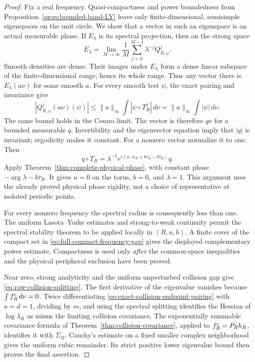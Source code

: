 \begin{proof}
Fix a real frequency. Quasi-compactness and power boundedness from
Proposition~\ref{prop:bounded-band-LY} leave only finite-dimensional,
semisimple eigenspaces on the unit circle. We show that a vector in
such an eigenspace is an actual measurable phase. If $E_\lambda$ is
its spectral projection, then on the strong space
\[
 E_\lambda=\lim_{M\to\infty}\frac1M
                       \sum_{j=0}^{M-1}\lambda^{-j}Q_{R,\omega}^j.
\]
Smooth densities are dense. Their images under $E_\lambda$ form a dense
linear subspace of the finite-dimensional range, hence its whole range.
Thus any vector there is $E_\lambda(a\nu)$ for some smooth $a$.
For every smooth test $\psi$, the exact pairing and invariance give
\[
 |Q_{R,\omega}^j(a\nu)(\psi)|
       \le\|a\|_\infty\int|\psi\circ T_R^j|\,d\nu
       =\|a\|_\infty\int|\psi|\,d\nu.
\]
The same bound holds in the Cesaro limit. The vector is therefore
$q\nu$ for a bounded measurable $q$. Invertibility and the eigenvector
equation imply that $|q|$ is invariant; ergodicity makes it constant.
For a nonzero vector normalize it to one. Then
\[
 q\circ T_R=\lambda^{-1}
   e^{i(u\cdot\kappa_R+b\tau_R-b\bar\tau_R)}q.
\]
Apply Theorem~\ref{thm:complete-physical-phase}, with constant phase
$-\arg\lambda-b\bar\tau_R$. It gives $u=0$ on the torus, $b=0$,
and $\lambda=1$. This argument uses the already proved physical phase
rigidity, not a choice of representative at isolated periodic points.

For every nonzero frequency the spectral radius is consequently less
than one. The uniform Lasota--Yorke estimates and strong-to-weak
continuity permit the spectral stability theorem
\cite[Theorem 2.1]{DZ} to be applied locally in $(R,u,b)$. A finite
cover of the compact set in \eqref{eq:full-compact-frequency-gap}
gives the displayed complementary power estimate. Compactness is used
only \emph{after} the common-space inequalities and the physical
peripheral exclusion have been proved.

Near zero, strong analyticity and the uniform unperturbed collision gap
give \eqref{eq:raw-collision-splitting}. The first derivative of the
eigenvalue vanishes because $\int f_R^{\rm c}\,d\nu=0$. Twice
differentiating \eqref{eq:exact-collision-endpoint-pairing} with
$a=d=1$, dividing by $m$, and using the spectral splitting identifies
the Hessian of $\log\lambda_R$ as minus the limiting collision
covariance. The exponentially summable covariance formula of
Theorem~\ref{thm:collision-covariance}, applied to $f_R^{\rm c}=P_Rh_R$,
identifies it with $\Sigma_R$. Cauchy's estimate on a fixed smaller
complex neighborhood gives the uniform cubic remainder. Its strict
positive lower eigenvalue bound then proves the final assertion.
\end{proof}

